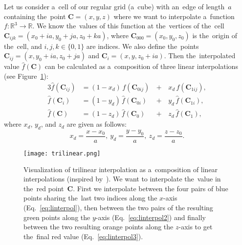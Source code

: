 				Let us consider a~cell of our regular grid (a~cube) with an~edge of length~$a$ containing the~point $\mathbf{C} = (x,y,z)$ where we want to interpolate a~function $f\colon\mathbb{R}^3\to\mathbb{R}$. We know the~values of this function at the~vertices of the~cell $\mathbf{C}_{ijk} = (x_0+ia,y_0+ja,z_0+ka)$, where $\mathbf{C}_{000} = (x_0,y_0,z_0)$ is the~origin of the~cell, and $i,j,k \in \{0,1\}$ are indices. We also define the~points $\mathbf{C}_{ij} = (x,y_0+ia,z_0+ja)$ and $\mathbf{C}_i=(x,y,z_0+ia)$. Then the~interpolated value $\widehat{f}(\mathbf{C})$ can be calculated as a~composition of three linear interpolations (see Figure~\ref{fig:trilin}):
					\begin{alignat}{3}
						\label{eq:linterpol}
						\widehat{f}(\mathbf{C}_{ij}) &= (1-x_d)\,f(\mathbf{C}_{0ij}) \,&+&\,x_d\, f(\mathbf{C}_{1ij}),\\
						\label{eq:linterpol2}
						\widehat{f}(\mathbf{C}_{i}) &= (1-y_d)\,\widehat{f}(\mathbf{C}_{0i}) &+&\,y_d\, \widehat{f}(\mathbf{C}_{1i}),\\
						\label{eq:linterpol3}
						\widehat{f}(\mathbf{C}) &= (1-z_d)\,\widehat{f}(\mathbf{C}_0) &+&\,z_d\, \widehat{f}(\mathbf{C}_1),
					\end{alignat}
				where $x_d$, $y_d$, and $z_d$ are given as follows:
					\begin{equation}
						x_d = \frac{x-x_0}{a},~y_d = \frac{y-y_0}{a},~z_d = \frac{z-z_0}{a}.
					\end{equation}
					
				\begin{figure}
					\centering
					\texttt{[image: trilinear.png]}
					\caption{Visualization of trilinear interpolation as a~composition of linear interpolations (inspired by~\cite{trilinear1}). We want to interpolate the~value in the~red point~$\mathbf{C}$. First we interpolate between the four pairs of blue points sharing the~last two indices along the $x$\protect\nobreakdash-axis (Eq.~\ref{eq:linterpol}), then between the two pairs of the resulting green points along the $y$\protect\nobreakdash-axis (Eq.~\ref{eq:linterpol2}) and finally between the two resulting orange points along the $z$\protect\nobreakdash-axis to get the~final red value (Eq.~\ref{eq:linterpol3}).}
					\label{fig:trilin}
				\end{figure}
					
